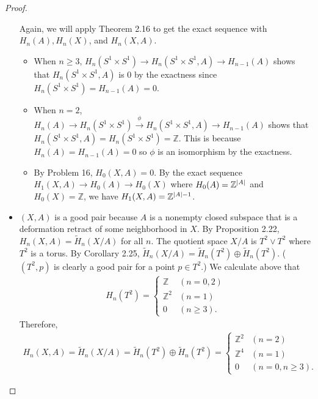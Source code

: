\documentclass[12pt, psamsfonts]{amsart}
\theoremstyle{definition}
\theoremstyle{remark}
\numberwithin{equation}{section}
\begin{document}
\begin{proof}
\begin{itemize}
      Again, we will apply Theorem 2.16 to get the exact sequence with $H_n(A), H_n(X)$, and $H_n(X, A)$.
      \begin{itemize}
        \item
          When $n \geq 3$, $H_n(S^1 \times S^1) \rightarrow H_n(S^1 \times S^1, A) \rightarrow H_{n - 1}(A)$ shows that $H_n(S^1 \times S^1, A)$ is 0 by the exactness since $H_n(S^1 \times S^1) = H_{n - 1}(A) = 0$.
        \item
          When $n = 2$, $H_n(A) \rightarrow H_n(S^1 \times S^1) \xrightarrow{\phi} H_n(S^1 \times S^1, A) \rightarrow H_{n - 1}(A)$ shows that $H_n(S^1 \times S^1, A) = H_n(S^1 \times S^1) = \mathbb{Z}$.
          This is because $H_n(A) = H_{n - 1}(A) = 0$ so $\phi$ is an isomorphism by the exactness.
        \item
          By Problem 16, $H_0(X, A) = 0$.
          By the exact sequence $H_1(X, A) \rightarrow H_0(A) \rightarrow H_0(X)$ where $H_0(A) = \mathbb{Z}^{\abs{A}}$ and $H_0(X) = \mathbb{Z}$, we have $H_1(X, A) = \mathbb{Z}^{\abs{A} - 1}$.
      \end{itemize}

    \item
      $(X, A)$ is a good pair because $A$ is a nonempty closed subspace that is a deformation retract of some neighborhood in $X$.
      By Proposition 2.22, $H_n(X, A) = \tilde{H}_n(X / A)$ for all $n$.
      The quotient space $X / A$ is $T^2 \vee T^2$ where $T^2$ is a torus.
      By Corollary 2.25, $\tilde{H}_n(X / A) = \tilde{H}_n(T^2) \oplus \tilde{H}_n(T^2)$.
      ($(T^2, p)$ is clearly a good pair for a point $p \in T^2$.)
      We calculate above that
      \begin{align*}
        H_n(T^2) = \begin{cases}
          \mathbb{Z} & (n = 0, 2) \\
          \mathbb{Z}^2 & (n = 1) \\
          0 & (n \geq 3).
        \end{cases}
      \end{align*}
      Therefore,
      \begin{align*}
        H_n(X, A) = \tilde{H}_n(X / A) = \tilde{H}_n(T^2) \oplus \tilde{H}_n(T^2) = \begin{cases}
          \mathbb{Z}^2 & (n = 2) \\
          \mathbb{Z}^4 & (n = 1) \\
          0 & (n = 0, n \geq 3).
        \end{cases}
      \end{align*}


\end{itemize}
\end{proof}
\end{document}
